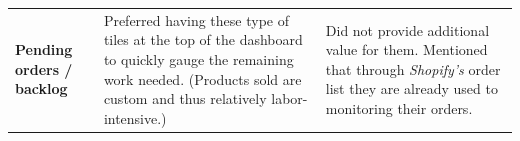 \documentclass{imc-inf}
\begin{document}
\begin{longtable}{@{}>{\raggedright\arraybackslash}p{3cm}p{5.75cm}p{5.75cm}@{}}
  \textbf{Pending orders / backlog}                                                                                                                                                                                                                                                                                                                                                                                                                                                                                                                                                                                                                                                                                                                                                                                                                                                                            &
  Preferred having these type of tiles at the top of the dashboard to quickly gauge the remaining work needed. (Products sold are custom and thus relatively labor-intensive.)                                                                                                                                                                                                                                                                                                                                                                                                                                                                                                                                                                                                                                                                                                                                 &
  Did not provide additional value for them. Mentioned that through \textit{Shopify's} order list they are already used to monitoring their orders.                                                                                                                                                                                                                                                                                                                                                                                                                                                                                                                                                                                                                                                                                                                                                                                                        \\[6pt]


\end{longtable}
\end{document}
